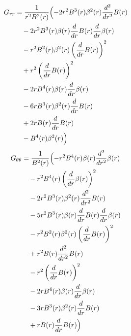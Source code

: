 \documentclass[11pt,a4paper]{article}
\begin{document}
\begin{align*}
  G_{rr} &= \frac{1}{r^{2} B^{2}{\left(r \right)}}\Bigl(- 2 r^{2} B^{3}{\left(r \right)} \beta^{2}{\left(r \right)} \frac{d^{2}}{d r^{2}} B{\left(r \right)} \\
  &\quad - 2 r^{2} B^{3}{\left(r \right)} \beta{\left(r \right)} \frac{d}{d r} B{\left(r \right)} \frac{d}{d r} \beta{\left(r \right)} \\
  &\quad - r^{2} B^{2}{\left(r \right)} \beta^{2}{\left(r \right)} \left(\frac{d}{d r} B{\left(r \right)}\right)^{2} \\
  &\quad + r^{2} \left(\frac{d}{d r} B{\left(r \right)}\right)^{2} \\
  &\quad - 2 r B^{4}{\left(r \right)} \beta{\left(r \right)} \frac{d}{d r} \beta{\left(r \right)} \\
  &\quad - 6 r B^{3}{\left(r \right)} \beta^{2}{\left(r \right)} \frac{d}{d r} B{\left(r \right)} \\
  &\quad + 2 r B{\left(r \right)} \frac{d}{d r} B{\left(r \right)} \\
  &\quad - B^{4}{\left(r \right)} \beta^{2}{\left(r \right)}\Bigr)
\end{align*}
\begin{align*}
  G_{\theta\theta} &= \frac{1}{B^{2}{\left(r \right)}}\Bigl(- r^{2} B^{4}{\left(r \right)} \beta{\left(r \right)} \frac{d^{2}}{d r^{2}} \beta{\left(r \right)} \\
  &\quad - r^{2} B^{4}{\left(r \right)} \left(\frac{d}{d r} \beta{\left(r \right)}\right)^{2} \\
  &\quad - 2 r^{2} B^{3}{\left(r \right)} \beta^{2}{\left(r \right)} \frac{d^{2}}{d r^{2}} B{\left(r \right)} \\
  &\quad - 5 r^{2} B^{3}{\left(r \right)} \beta{\left(r \right)} \frac{d}{d r} B{\left(r \right)} \frac{d}{d r} \beta{\left(r \right)} \\
  &\quad - r^{2} B^{2}{\left(r \right)} \beta^{2}{\left(r \right)} \left(\frac{d}{d r} B{\left(r \right)}\right)^{2} \\
  &\quad + r^{2} B{\left(r \right)} \frac{d^{2}}{d r^{2}} B{\left(r \right)} \\
  &\quad - r^{2} \left(\frac{d}{d r} B{\left(r \right)}\right)^{2} \\
  &\quad - 2 r B^{4}{\left(r \right)} \beta{\left(r \right)} \frac{d}{d r} \beta{\left(r \right)} \\
  &\quad - 3 r B^{3}{\left(r \right)} \beta^{2}{\left(r \right)} \frac{d}{d r} B{\left(r \right)} \\
  &\quad + r B{\left(r \right)} \frac{d}{d r} B{\left(r \right)}\Bigr)
\end{align*}
\end{document}
